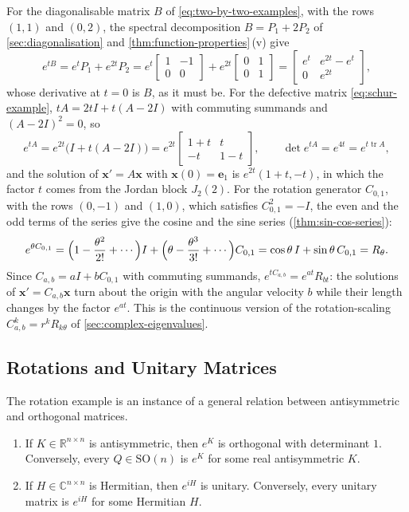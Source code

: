 For the diagonalisable matrix $B$ of \eqref{eq:two-by-two-examples}, with the rows $(1,1)$ and $(0,2)$, the spectral decomposition $B=P_1+2P_2$ of \cref{sec:diagonalisation} and \cref{thm:function-properties}\,(v) give
\[
e^{tB}=e^tP_1+e^{2t}P_2=e^t\begin{bmatrix}1&-1\\0&0\end{bmatrix}+e^{2t}\begin{bmatrix}0&1\\0&1\end{bmatrix}=\begin{bmatrix}e^t&e^{2t}-e^t\\0&e^{2t}\end{bmatrix},
\]
whose derivative at $t=0$ is $B$, as it must be. For the defective matrix \eqref{eq:schur-example}, $tA=2tI+t(A-2I)$ with commuting summands and $(A-2I)^2=0$, so
\[
e^{tA}=e^{2t}\bigl(I+t(A-2I)\bigr)=e^{2t}\begin{bmatrix}1+t&t\\-t&1-t\end{bmatrix},\qquad\det e^{tA}=e^{4t}=e^{t\operatorname{tr}A},
\]
and the solution of $\mathbf x'=A\mathbf x$ with $\mathbf x(0)=\mathbf e_1$ is $e^{2t}(1+t,-t)$, in which the factor $t$ comes from the Jordan block $J_2(2)$. For the rotation generator $C_{0,1}$, with the rows $(0,-1)$ and $(1,0)$, which satisfies $C_{0,1}^2=-I$, the even and the odd terms of the series give the cosine and the sine series (\cref{thm:sin-cos-series}):
\[
e^{\theta C_{0,1}}=\Bigl(1-\frac{\theta^2}{2!}+\cdots\Bigr)I+\Bigl(\theta-\frac{\theta^3}{3!}+\cdots\Bigr)C_{0,1}=\cos\theta\,I+\sin\theta\,C_{0,1}=R_\theta .
\]
Since $C_{a,b}=aI+bC_{0,1}$ with commuting summands, $e^{tC_{a,b}}=e^{at}R_{bt}$: the solutions of $\mathbf x'=C_{a,b}\mathbf x$ turn about the origin with the angular velocity $b$ while their length changes by the factor $e^{at}$. This is the continuous version of the rotation-scaling $C_{a,b}^k=r^kR_{k\theta}$ of \cref{sec:complex-eigenvalues}.

\subsection{Rotations and Unitary Matrices}

The rotation example is an instance of a general relation between antisymmetric and orthogonal matrices.

\begin{proposition}
\label{prop:exp-orthogonal}
\leavevmode
\begin{enumerate}
\item If $K\in\mathbb R^{n\times n}$ is antisymmetric, then $e^K$ is orthogonal with determinant $1$. Conversely, every $Q\in\mathrm{SO}(n)$ is $e^K$ for some real antisymmetric $K$.
\item If $H\in\mathbb C^{n\times n}$ is Hermitian, then $e^{iH}$ is unitary. Conversely, every unitary matrix is $e^{iH}$ for some Hermitian $H$.
\end{enumerate}
\end{proposition}

